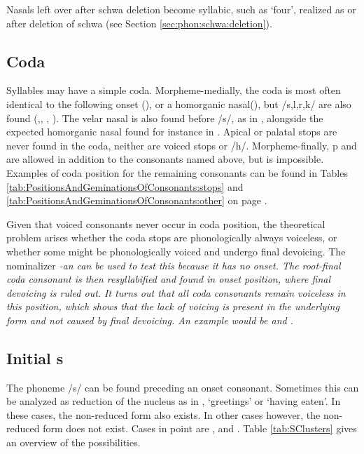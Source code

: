 Nasals left over after schwa deletion become syllabic, such as `four', realized as  or  after deletion of schwa (see Section \ref{sec:phon:schwa:deletion}).

\subsection{Coda}\label{sec:phon:Coda}
Syllables may have a simple coda. Morpheme-medially, the coda is most often identical to the following onset (), or a homorganic nasal(), but /s,l,r,k/ are also found (,, , ). The velar nasal  is also found before /s/, as in , alongside the expected homorganic nasal found for instance in . Apical or palatal stops are never found in the coda, neither are voiced stops or /h/. Morpheme-finally, p and \dentt{} are allowed in addition to the consonants named above, but \ny{} is impossible. Examples of coda position for the remaining consonants can be found in Tables \ref{tab:PositionsAndGeminationsOfConsonants:stops} and \ref{tab:PositionsAndGeminationsOfConsonants:other} on page \pageref{tab:PositionsAndGeminationsOfConsonants:stops}.

Given that voiced consonants never occur in coda position, the theoretical problem arises whether the coda stops are phonologically always voiceless, or whether some might be phonologically voiced and undergo final devoicing. The nominalizer \em -an \em can be used to test this because it has no onset. The root-final coda consonant is then resyllabified and found in onset position, where final devoicing is ruled out. It turns out that all coda consonants remain voiceless in this position, which shows that the lack of voicing is present in the underlying form and not caused by final devoicing. An example would be  and .



\subsection{Initial s}\label{sec:phon:Initials}
The phoneme /s/ can be found preceding an onset consonant. Sometimes this can be analyzed as reduction of the nucleus as in , `greetings' or  `having eaten'. In these cases, the non-reduced form also exists. In other cases however, the non-reduced form does not exist. Cases in point are ,  and . Table \ref{tab:SClusters} gives an overview of the possibilities.

